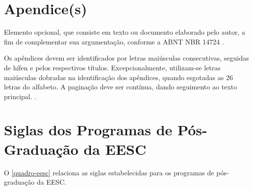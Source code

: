 
\begin{apendicesenv}
\partapendices
\chapter{Apendice(s)}
Elemento opcional, que consiste em texto ou documento elaborado pelo autor, a fim de complementar sua argumentação, conforme a ABNT NBR 14724 \cite{nbr14724}.

Os apêndices devem ser identificados por letras maiúsculas consecutivas, seguidas de hífen e pelos respectivos títulos. Excepcionalmente, utilizam-se letras maiúsculas dobradas na identificação dos apêndices, quando esgotadas as 26 letras do alfabeto. A paginação deve ser contínua, dando seguimento ao texto principal. \cite{sibi2009}.

\chapter{Siglas dos Programas de Pós-Graduação da EESC}
O \autoref{quadro-eesc} relaciona as siglas estabelecidas para os programas de pós-graduação da EESC.


\end{apendicesenv}
